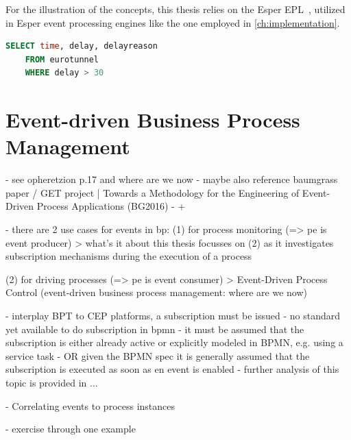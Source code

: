 For the illustration of the concepts, this thesis relies on the Esper \ac{EPL}~\cite{esperhome}, utilized in Esper event processing engines like the one employed in \autoref{ch:implementation}.


\begin{lstlisting}[language=sql,caption={Sample Query in Esper EPL},label=lst:epl-query-example]
	SELECT time, delay, delayreason
	FROM eurotunnel
	WHERE delay > 30
\end{lstlisting}

\section{Event-driven Business Process Management}
- see opheretzion p.17 and where are we now
- maybe also reference baumgrass paper / GET project | Towards a Methodology for the Engineering
of Event-Driven Process Applications (BG2016)
- + 

- there are 2 use cases for events in bp: 
(1) for process monitoring (=> pe is event producer)
> what's it about
this thesis focusses on (2) as it investigates subscription mechanisms during the execution of a process

(2) for driving processes (=> pe is event consumer)
> Event-Driven Process Control (event-driven business process management: where are we now)

- interplay BPT to CEP platforms, a subscription must be issued
- no standard yet available to do subscription in bpmn
- it must be assumed that the subscription is either already active or explicitly modeled in BPMN, e.g. using a service task
- OR given the BPMN spec it is generally assumed that the subscription is executed as soon as en event is enabled
- further analysis of this topic is provided in ...

- Correlating events to process instances

- exercise through one example



